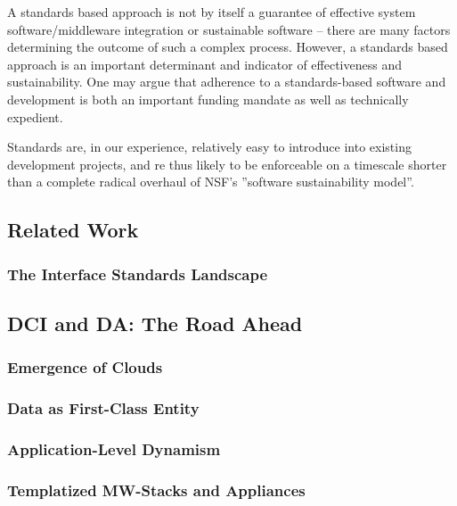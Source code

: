 \documentclass[a4paper,12pt]{article}
\begin{document}
A standards based approach is not by itself a guarantee of effective
system software/middleware integration or sustainable software --
there are many factors determining the outcome of such a complex
process. However, a standards based approach is an important
determinant and indicator of effectiveness and sustainability.  One
may argue that adherence to a standards-based software and development
is both an important funding mandate as well as technically expedient.  

Standards are, in our experience, relatively easy to introduce into
 existing development projects, and re thus likely to be enforceable
 on a timescale shorter than a complete radical overhaul of NSF’s
 ''software sustainability model''.

\subsection{Related Work}

\subsubsection{The Interface Standards Landscape}\label{interface_landscape}

\subsection{DCI and DA: The Road Ahead}

\subsubsection{Emergence of Clouds}

\subsubsection{Data as First-Class Entity}

\subsubsection{Application-Level Dynamism}

\subsubsection{Templatized MW-Stacks and Appliances}

 
\end{document}
